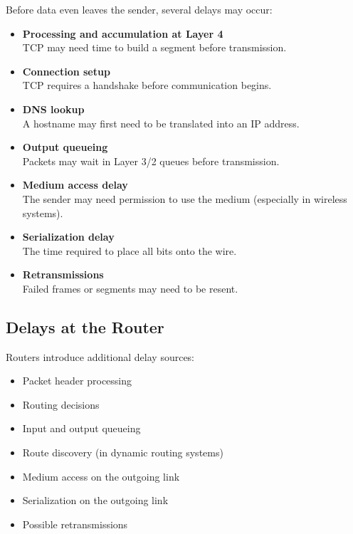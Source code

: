 Before data even leaves the sender, several delays may occur:

\begin{itemize}[leftmargin=1.5em]
    \item \textbf{Processing and accumulation at Layer 4} \\
    TCP may need time to build a segment before transmission.

    \item \textbf{Connection setup} \\
    TCP requires a handshake before communication begins.

    \item \textbf{DNS lookup} \\
    A hostname may first need to be translated into an IP address.

    \item \textbf{Output queueing} \\
    Packets may wait in Layer 3/2 queues before transmission.

    \item \textbf{Medium access delay} \\
    The sender may need permission to use the medium (especially in wireless systems).

    \item \textbf{Serialization delay} \\
    The time required to place all bits onto the wire.

    \item \textbf{Retransmissions} \\
    Failed frames or segments may need to be resent.
\end{itemize}

\subsection{Delays at the Router}

Routers introduce additional delay sources:

\begin{itemize}[leftmargin=1.5em]
    \item Packet header processing
    \item Routing decisions
    \item Input and output queueing
    \item Route discovery (in dynamic routing systems)
    \item Medium access on the outgoing link
    \item Serialization on the outgoing link
    \item Possible retransmissions
\end{itemize}

